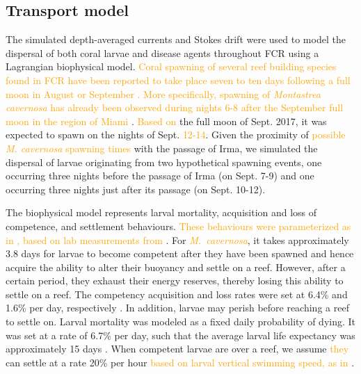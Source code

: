 \documentclass[fleqn,10pt]{wlscirep}
\newcommand{\modif}[1]{\textcolor{orange}{#1}}
\begin{document}
\subsection{Transport model}
The simulated depth-averaged currents and Stokes drift were used to model the dispersal of both coral larvae and disease agents throughout FCR using a Lagrangian biophysical model. \modif{Coral spawning of several reef building species found in FCR have been reported to take place seven to ten days following a full moon in August or September \citep{hagman1998timing}. More specifically, spawning of \textit{Montastrea cavernosa} has already been observed during nights 6-8 after the September full moon in the region of Miami \citep{bright2021quicklook}}. \modif{Based on} the full moon of Sept. 2017, it was expected to spawn on the nights of Sept. \modif{12-14}. Given the proximity of \modif{possible \textit{M. cavernosa} spawning times} with the passage of Irma, we simulated the dispersal of larvae originating from two hypothetical spawning events, one occurring three nights before the passage of Irma (on Sept. 7-9) and one occurring three nights just after its passage (on Sept. 10-12).

The biophysical model represents larval mortality, acquisition and loss of competence, and settlement behaviours. \modif{These behaviours were parameterized as in \cite{Frys2020}, based on lab measurements from \cite{Kuba2016}}. For \modif{\it M.~cavernosa}, it takes approximately 3.8 days for larvae to become competent after they have been spawned and hence acquire the ability to alter their buoyancy and settle on a reef. However, after a certain period, they exhaust their energy reserves, thereby losing this ability to settle on a reef. The competency acquisition and loss rates were set at 6.4\% and 1.6\% per day, respectively \citep{Kuba2016}. In addition, larvae may perish before reaching a reef to settle on. Larval mortality was modeled as a fixed daily probability of dying. It was set at a rate of 6.7\% per day, such that the average larval life expectancy was approximately 15 days \citep{Kuba2016}. When competent larvae are over a reef, we assume \modif{they} can settle at a rate 20\% per hour \modif{based on larval vertical swimming speed, as in \cite{king2023larval}}.
\end{document}
